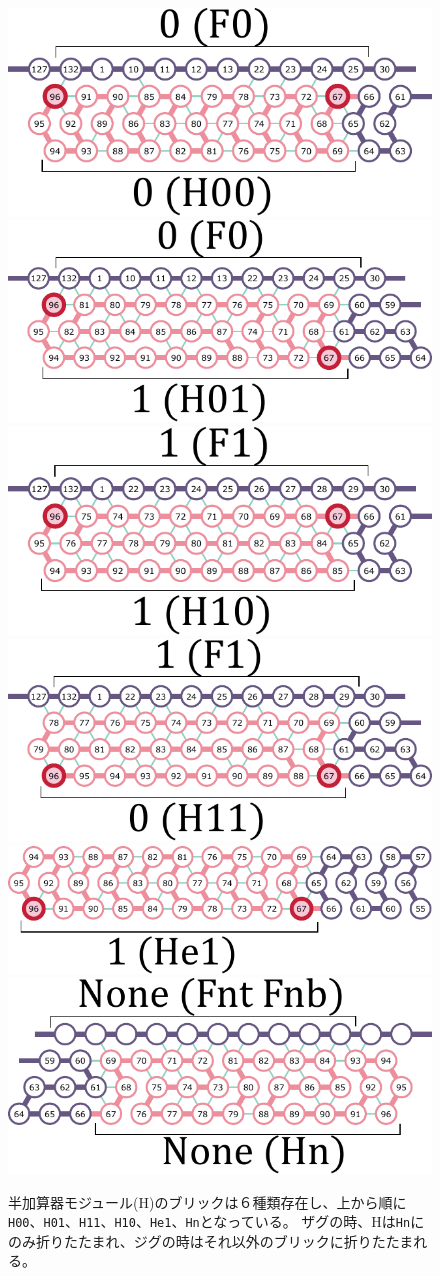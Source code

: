 \documentclass[a4j,11pt]{article}
\begin{document}
%
%
\begin{figure}[tb]
  \centering
   \includegraphics[width=0.45\linewidth]{fig/svg/H00_1.pdf}\\
   \vspace*{3mm}
   \includegraphics[width=0.45\linewidth]{fig/svg/H01_1.pdf}\\
   \vspace*{3mm}
   \includegraphics[width=0.45\linewidth]{fig/svg/H10_1.pdf}\\
   \vspace*{3mm}
   \includegraphics[width=0.45\linewidth]{fig/svg/H11_1.pdf}\\
   \vspace*{3mm}
   \includegraphics[width=0.45\linewidth]{fig/svg/He1_1.pdf}\\
   \vspace*{3mm}
   \includegraphics[width=0.45\linewidth]{fig/svg/Hn_1.pdf}

 \caption{半加算器モジュール(H)のブリックは６種類存在し、上から順に\texttt{H00}、\texttt{H01}、\texttt{H11}、\texttt{H10}、\texttt{He1}、\texttt{Hn}となっている。
 ザグの時、Hは\texttt{Hn}にのみ折りたたまれ、ジグの時はそれ以外のブリックに折りたたまれる。}
 \label{fig:halfadders}
\end{figure}
\end{document}
